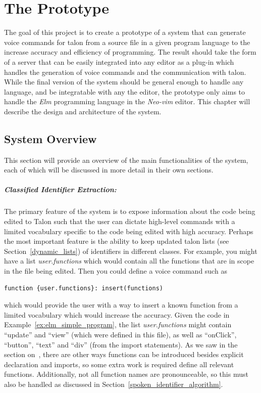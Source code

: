 \documentclass[../thesis.tex]{subfiles}
\begin{document}
\chapter{The Prototype}\label{the_project}
The goal of this project is to create a prototype of a system that can generate voice commands
for talon from a source file in a given program language to the increase accuracy and efficiency of programming.
The result should take the form of a server that can be easily integrated into any editor as a plug-in
which handles the generation of voice commands and the communication with talon.
While the final version of the system should be general enough to handle any language, and be integratable with any the editor,
the prototype only aims to handle the \textit{Elm} programming language in the \textit{Neo-vim} editor.
This chapter will describe the design and architecture of the system.

\section{System Overview}%
\label{sec:voice_command_generation}
This section will provide an overview of the main functionalities of the system,
each of which will be discussed in more detail in their own sections.

\paragraph{Classified Identifier Extraction:}%
\label{par:classified_identifier_extraction}
The primary feature of the system is to expose information about the code being edited
to Talon such that the user can dictate high-level commands with a limited vocabulary
specific to the code being edited with high accuracy.
Perhaps the most important feature is the ability to keep updated talon lists (see Section~\ref{dynamic_lists})
of identifiers in different classes. For example, you might have a list \textit{user.functions} which would contain
all the functions that are in scope in the file being edited.
Then you could define a voice command such as 
\begin{verbatim}
function {user.functions}: insert(functions)
\end{verbatim} 
which would provide the user with a way to insert a known function from a limited vocabulary which would increase the accuracy.
Given the code in Example~\ref{ex:elm_simple_program}, the list \textit{user.functions} might contain ``update'' and ``view''
(which were defined in this file), as well as ``onClick'', ``button'', ``text'' and ``div'' (from the import statements).
As we saw in the section on~, there are other ways functions can be introduced
besides explicit declaration and imports, so some extra work is required define all relevant functions.
Additionally, not all function names are pronounceable, so this must also be handled as discussed in Section~\ref{spoken_identifier_algorithm}.
\end{document}
